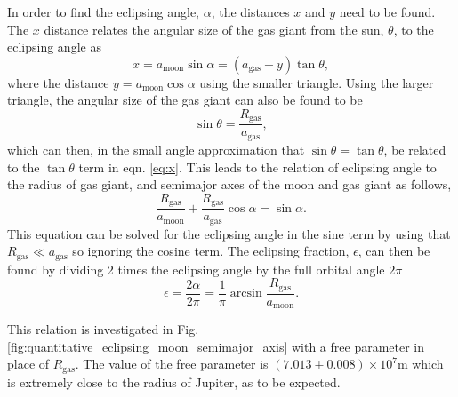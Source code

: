 \documentclass[12pt, onecolumn]{revtex4-2}    %
\begin{document}
In order to find the eclipsing angle, $\alpha$, the distances $x$ and $y$ need to be found.
The $x$ distance relates the angular size of the gas giant from the sun, $\theta$, to the eclipsing angle as
\begin{equation}
  x = a_\text{moon} \sin \alpha = (a_\text{gas} + y) \tan \theta,
  \label{eq:x}
\end{equation}
where the distance $y = a_\text{moon} \cos \alpha$ using the smaller triangle.
Using the larger triangle, the angular size of the gas giant can also be found to be
\begin{equation}
  \sin \theta = \frac{R_\text{gas}}{a_\text{gas}},
  \label{eq:sintheta}
\end{equation}
which can then, in the small angle approximation that $\sin\theta = \tan\theta$, be related to the $\tan \theta$ term in eqn. \eqref{eq:x}.
This leads to the relation of eclipsing angle to the radius of gas giant, and semimajor axes of the moon and gas giant as follows,
\begin{equation}
  \frac{R_\text{gas}}{a_\text{moon}} + \frac{R_\text{gas}}{a_\text{gas}}\cos\alpha = \sin\alpha .
  \label{eq:alpha}
\end{equation}
This equation can be solved for the eclipsing angle in the sine term by using that $R_\text{gas} \ll a_\text{gas}$ so ignoring the cosine term.
The eclipsing fraction, $\epsilon$, can then be found by dividing 2 times the eclipsing angle by the full orbital angle $2\pi$
\begin{equation}
  \epsilon = \frac{2\alpha}{2\pi} = \frac{1}{\pi}\arcsin{\frac{R_\text{gas}}{a_\text{moon}}} .
  \label{eq:eclipsing_fraction}
\end{equation}

This relation is investigated in Fig. \ref{fig:quantitative_eclipsing_moon_semimajor_axis} with a free parameter in place of $R_\text{gas}$.
The value of the free parameter is $(7.013\pm 0.008) \times 10^7 \text{m}$ which is extremely close to the radius of Jupiter, as to be expected.
\end{document}

